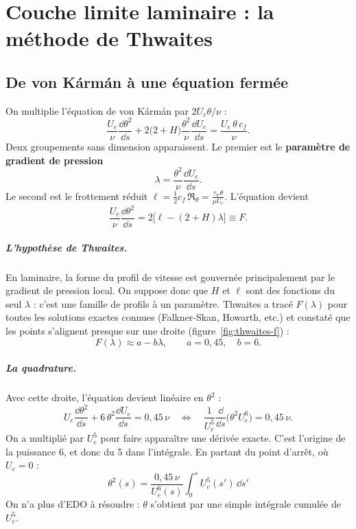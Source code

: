 \chapter{Couche limite laminaire : la méthode de Thwaites}\label{ch:thwaites}

\section{De von Kármán à une équation fermée}
On multiplie l'équation de von Kármán par $2U_e\theta/\nu$ :
\[
\frac{U_e}{\nu}\frac{\dd\theta^2}{\dd s}+2\big(2+H\big)\frac{\theta^2}{\nu}\frac{\dd U_e}{\dd s}=\frac{U_e\,\theta\,c_f}{\nu}.
\]
Deux groupements sans dimension apparaissent. Le premier est le \textbf{paramètre de gradient de pression}
\[
\lambda=\frac{\theta^2}{\nu}\frac{\dd U_e}{\dd s}.
\]
Le second est le frottement réduit $\ell=\tfrac12c_f\,\Re_\theta=\tfrac{\tau_w\theta}{\mu U_e}$. L'équation devient
\[
\frac{U_e}{\nu}\frac{\dd\theta^2}{\dd s}=2\big[\ell-(2+H)\lambda\big]\equiv F .
\]

\paragraph{L'hypothèse de Thwaites.} En laminaire, la forme du profil de vitesse est gouvernée principalement par le gradient de pression local. On suppose donc que $H$ et $\ell$ sont des fonctions du seul $\lambda$ : c'est une famille de profils à un paramètre. Thwaites a tracé $F(\lambda)$ pour toutes les solutions exactes connues (Falkner-Skan, Howarth, etc.) et constaté que les points s'alignent presque sur une droite (figure~\ref{fig:thwaites-f}) :
\[
F(\lambda)\approx a-b\lambda,\qquad a=0{,}45,\quad b=6 .
\]

\paragraph{La quadrature.} Avec cette droite, l'équation devient linéaire en $\theta^2$ :
\[
U_e\frac{\dd\theta^2}{\dd s}+6\,\theta^2\frac{\dd U_e}{\dd s}=0{,}45\,\nu
\quad\Longleftrightarrow\quad
\frac{1}{U_e^5}\frac{\dd}{\dd s}\big(\theta^2U_e^6\big)=0{,}45\,\nu .
\]
On a multiplié par $U_e^5$ pour faire apparaître une dérivée exacte. C'est l'origine de la puissance 6, et donc du 5 dans l'intégrale. En partant du point d'arrêt, où $U_e=0$ :
\[
\boxed{\ \theta^2(s)=\frac{0{,}45\,\nu}{U_e^6(s)}\int_0^sU_e^5(s')\,\dd s'\ }
\]
On n'a plus d'EDO à résoudre : $\theta$ s'obtient par une simple intégrale cumulée de $U_e^5$.

